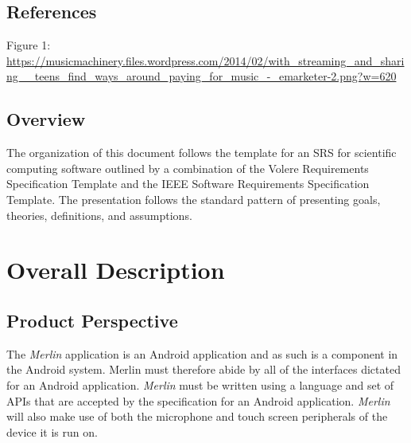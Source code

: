 \documentclass[]{article}
\newcommand{\merlin}{\textit{Merlin }}
\begin{document}
\subsection{References}
\label{sub:references}
Figure 1: \url{https://musicmachinery.files.wordpress.com/2014/02/with_streaming_and_sharing__teens_find_ways_around_paying_for_music_-_emarketer-2.png?w=620}

\subsection{Overview}
\label{sub:overview}
	The organization of this document follows the template for an SRS for scientific computing software outlined by a combination of the Volere Requirements Specification Template and the IEEE Software Requirements Specification Template. The presentation follows the standard pattern of presenting goals, theories, definitions, and assumptions.


\section{Overall Description}
\label{sec:overall_description}

\subsection{Product Perspective}
\label{sub:product_perspective}
The \merlin application is an Android application and as such is a component in the Android system. Merlin must therefore abide by all of the interfaces dictated for an Android application. \merlin must be written using a language and set of APIs that are accepted by the specification for an Android application. \merlin will also make use of both the microphone and touch screen peripherals of the device it is run on.
\end{document}
